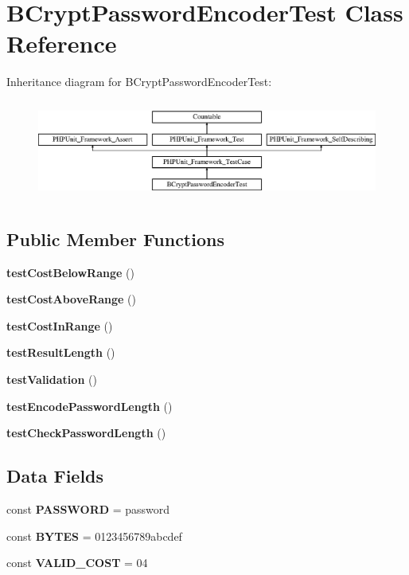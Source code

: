 \section{B\+Crypt\+Password\+Encoder\+Test Class Reference}
\label{class_symfony_1_1_component_1_1_security_1_1_core_1_1_tests_1_1_encoder_1_1_b_crypt_password_encoder_test}
Inheritance diagram for B\+Crypt\+Password\+Encoder\+Test\+:\begin{figure}[H]
\begin{center}
\leavevmode
\includegraphics[height=3.303835cm]{class_symfony_1_1_component_1_1_security_1_1_core_1_1_tests_1_1_encoder_1_1_b_crypt_password_encoder_test}
\end{center}
\end{figure}
\subsection*{Public Member Functions}
\begin{DoxyCompactItemize}
\item 
{\bf test\+Cost\+Below\+Range} ()
\item 
{\bf test\+Cost\+Above\+Range} ()
\item 
{\bf test\+Cost\+In\+Range} ()
\item 
{\bf test\+Result\+Length} ()
\item 
{\bf test\+Validation} ()
\item 
{\bf test\+Encode\+Password\+Length} ()
\item 
{\bf test\+Check\+Password\+Length} ()
\end{DoxyCompactItemize}
\subsection*{Data Fields}
\begin{DoxyCompactItemize}
\item 
const {\bf P\+A\+S\+S\+W\+O\+R\+D} = \textquotesingle{}password\textquotesingle{}
\item 
const {\bf B\+Y\+T\+E\+S} = \textquotesingle{}0123456789abcdef\textquotesingle{}
\item 
const {\bf V\+A\+L\+I\+D\+\_\+\+C\+O\+S\+T} = \textquotesingle{}04\textquotesingle{}
\end{DoxyCompactItemize}
